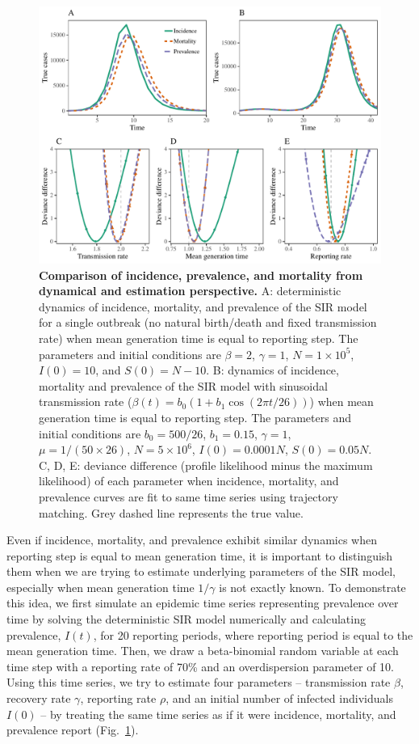 \documentclass{article}
\newcommand{\fref}[1]{Fig.~\ref{fig:#1}}
\begin{document}
\begin{figure}[!ht]
\includegraphics[width=\textwidth]{../figure/compare_profile_likelihood.pdf}
\caption{
\textbf{Comparison of incidence, prevalence, and mortality from dynamical and estimation perspective.}
A: deterministic dynamics of incidence, mortality, and prevalence of the SIR model for a single outbreak (no natural birth/death and fixed transmission rate) when mean generation time is equal to reporting step.
The parameters and initial conditions are $\beta = 2$, $\gamma = 1$, $N = 1 \times 10^5$, $I(0) = 10$, and $S(0) = N - 10$.
B: dynamics of incidence, mortality and prevalence of the SIR model with sinusoidal transmission rate ($\beta(t) = b_0 (1 + b_1 \cos (2 \pi t/26))$) when mean generation time is equal to reporting step.
The parameters and initial conditions are $b_0 = 500/26$, $b_1 = 0.15$, $\gamma = 1$, $\mu = 1/(50 \times 26)$, $N = 5 \times 10^6$, $I(0) = 0.0001 N$, $S(0) = 0.05 N$.
C, D, E: deviance difference (profile likelihood minus the maximum likelihood) of each parameter when incidence, mortality, and prevalence curves are fit to same time series using trajectory matching. 
Grey dashed line represents the true value.
} 
\label{fig:incidence}
\end{figure}

Even if incidence, mortality, and prevalence exhibit similar dynamics when reporting step is equal to mean generation time, it is important to distinguish them when we are trying to estimate underlying parameters of the SIR model, especially when mean generation time $1/\gamma$ is not exactly known.
To demonstrate this idea, we first simulate an epidemic time series representing prevalence over time by solving the deterministic SIR model numerically and calculating prevalence, $I(t)$, for 20 reporting periods, where reporting period is equal to the mean generation time. Then, we draw a beta-binomial random variable at each time step with a reporting rate of 70\% and an overdispersion parameter of 10.
Using this time series, we try to estimate four parameters -- transmission rate $\beta$, recovery rate $\gamma$, reporting rate $\rho$, and an initial number of infected individuals $I(0)$ -- by treating the same time series as if it were incidence, mortality, and prevalence report (\fref{incidence}).
\end{document}
